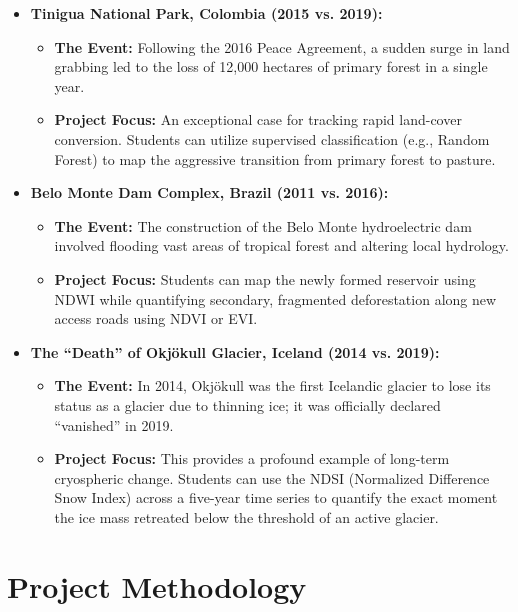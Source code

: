 \documentclass{article}
\begin{document}
\begin{enumerate}
    \begin{itemize}
        \item \textbf{Tinigua National Park, Colombia (2015 vs. 2019):}
        \begin{itemize}
            \item \textbf{The Event:} Following the 2016 Peace Agreement, a sudden surge in land grabbing led to the loss of 12,000 hectares of primary forest in a single year.
            \item \textbf{Project Focus:} An exceptional case for tracking rapid land-cover conversion. Students can utilize supervised classification (e.g., Random Forest) to map the aggressive transition from primary forest to pasture.
        \end{itemize}
        \item \textbf{Belo Monte Dam Complex, Brazil (2011 vs. 2016):}
        \begin{itemize}
            \item \textbf{The Event:} The construction of the Belo Monte hydroelectric dam involved flooding vast areas of tropical forest and altering local hydrology.
            \item \textbf{Project Focus:} Students can map the newly formed reservoir using NDWI while quantifying secondary, fragmented deforestation along new access roads using NDVI or EVI.
        \end{itemize}
        \item \textbf{The ``Death'' of Okjökull Glacier, Iceland (2014 vs. 2019):}
        \begin{itemize}
            \item \textbf{The Event:} In 2014, Okjökull was the first Icelandic glacier to lose its status as a glacier due to thinning ice; it was officially declared ``vanished'' in 2019.
            \item \textbf{Project Focus:} This provides a profound example of long-term cryospheric change. Students can use the NDSI (Normalized Difference Snow Index) across a five-year time series to quantify the exact moment the ice mass retreated below the threshold of an active glacier.
        \end{itemize}
    \end{itemize}
\end{enumerate}

\section{Project Methodology}
\end{document}
